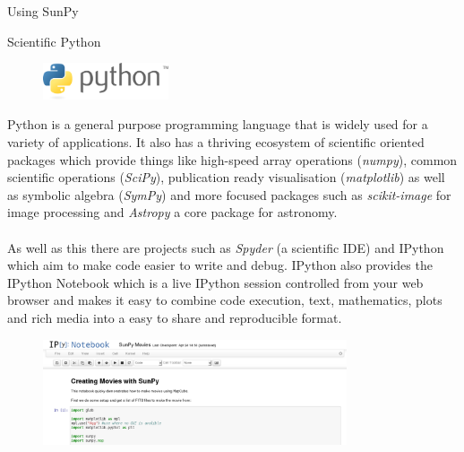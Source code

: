\documentclass[a0paper,portrait]{baposter}
\begin{document}
\begin{poster}
\begin{posterbox}[name=examples,span=2,column=0]{Using SunPy}
\end{posterbox}

\begin{posterbox}[name=scipy,span=2,column=0,row=0,below=examples,above=bottom]{Scientific Python}
\begin{figure}
	\includegraphics[width=10em]{python-logo-inkscape}
\end{figure}
Python is a general purpose programming language that is widely used for a variety of applications.
It also has a thriving ecosystem of scientific oriented packages which provide things like high-speed array operations (\textit{numpy}), common scientific operations (\textit{SciPy}), publication ready visualisation (\textit{matplotlib}) as well as symbolic algebra (\textit{SymPy}) and more focused packages such as \textit{scikit-image} for image processing and \textit{Astropy} a core package for astronomy.
\\
\\
As well as this there are projects such as \textit{Spyder} (a scientific IDE) and IPython which aim to make code easier to write and debug. IPython also provides the IPython Notebook which is a live IPython session controlled from your web browser and makes it easy to combine code execution, text, mathematics, plots and rich media into a easy to share and reproducible format.

\begin{figure}[H]
\centering
\includegraphics[width=0.8\textwidth]{notebook}
\end{figure}
\end{posterbox}

\end{poster}
\end{document}
